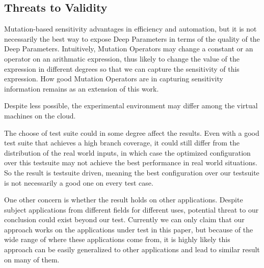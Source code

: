 \subsection{Threats to Validity}

Mutation-based sensitivity advantages in efficiency and automation, but it is not necessarily the best way to expose Deep Parameters in terms of the quality of the Deep Parameters. Intuitively, Mutation Operators may change a constant or an operator on an arithmatic expression, thus likely to change the value of the expression in different degrees so that we can capture the sensitivity of this expression. How good Mutation Operators are in capturing sensitivity information remains as an extension of this work.

Despite less possible, the experimental environment may differ among the virtual machines on the cloud. 

The choose of test suite could in some degree affect the results. Even with a good test suite that achieves a high branch coverage, it could still differ from the distribution of the real world inputs, in which case the optimized configuration over this testsuite may not achieve the best performance in real world situations. So the result is testsuite driven, meaning the best configuration over our testsuite is not necessarily a good one on every test case.

One other concern is whether the result holds on other applications. Despite subject applications from different fields for different uses, potential threat to our conclusion could exist beyond our test. Currently we can only claim that our approach works on the applications under test in this paper, but because of the wide range of where these applications come from, it is highly likely this approach can be easily generalized to other applications and lead to similar result on many of them.
